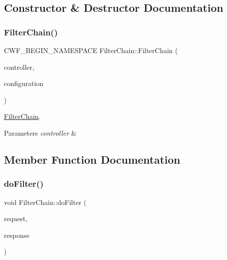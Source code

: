 \subsection{Constructor \& Destructor Documentation}
\mbox{\label{class_filter_chain_a9d506944c4a8d387aae3c7b0aa7c6ac7}} 
\subsubsection{\texorpdfstring{Filter\+Chain()}{FilterChain()}}
{\footnotesize\ttfamily C\+W\+F\+\_\+\+B\+E\+G\+I\+N\+\_\+\+N\+A\+M\+E\+S\+P\+A\+CE Filter\+Chain\+::\+Filter\+Chain (\begin{DoxyParamCaption}\item[{\hyperlink{class_controller}{Controller} $\ast$}]{controller,  }\item[{const \hyperlink{class_configuration}{Configuration} \&}]{configuration }\end{DoxyParamCaption})}



\hyperlink{class_filter_chain}{Filter\+Chain}. 


\begin{DoxyParams}{Parameters}
{\em controller} & \\
\hline
\end{DoxyParams}


\subsection{Member Function Documentation}
\mbox{\label{class_filter_chain_a873d7d3362388c2b7f2e958e8971be94}} 
\subsubsection{\texorpdfstring{do\+Filter()}{doFilter()}}
{\footnotesize\ttfamily void Filter\+Chain\+::do\+Filter (\begin{DoxyParamCaption}\item[{C\+W\+F\+::\+Request \&}]{request,  }\item[{C\+W\+F\+::\+Response \&}]{response }\end{DoxyParamCaption})}



